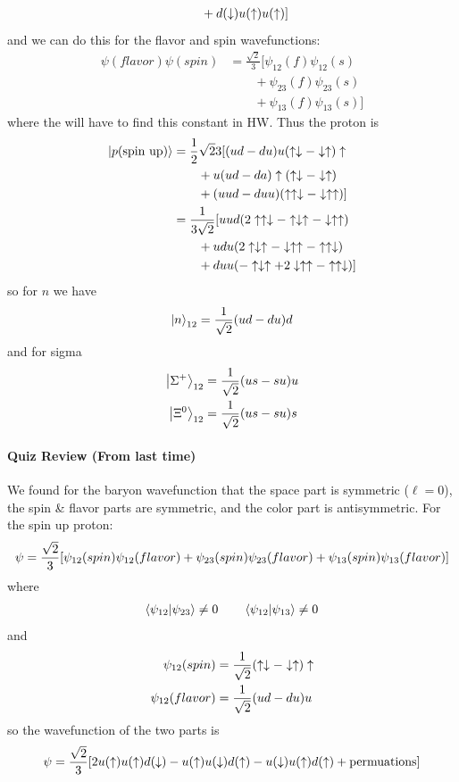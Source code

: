 \documentclass[../main.tex]{subfiles}
\begin{document}
\begin{itemize}
\begin{align*}
        &\qquad + d(\downarrow) u(\uparrow) u(\uparrow)] \\
    \end{align*}
    and we can do this for the flavor and spin wavefunctions:
    \begin{align*}
        \psi(flavor) \psi(spin) &= \frac{\sqrt{2}}{3} [\psi_{12}(f)\psi_{12}(s) \\
        &\qquad + \psi_{23}(f)\psi_{23}(s) \\
        &\qquad + \psi_{13}(f)\psi_{13}(s)]
    \end{align*}
where the will have to find this constant in HW. Thus the proton is
\begin{align*}
    \ket{p(\text{spin up})} &= \frac{1}{2 }\sqrt{2}{3} [(ud -du)u (\uparrow\downarrow - \downarrow\uparrow)\uparrow \\
    &\qquad + u(ud - da) \uparrow(\uparrow\downarrow - \downarrow\uparrow) \\
    &\qquad + (uud - duu) (\uparrow\uparrow\downarrow - \downarrow\uparrow\uparrow)] \\
    &= \frac{1}{3\sqrt{2}} [uud(2\uparrow\uparrow\downarrow - \uparrow\downarrow\uparrow - \downarrow\uparrow\uparrow) \\
    &\qquad + udu(2\uparrow\downarrow\uparrow - \downarrow\uparrow\uparrow - \uparrow\uparrow\downarrow) \\
    &\qquad + duu(-\uparrow\downarrow\uparrow + 2\downarrow\uparrow\uparrow - \uparrow\uparrow\downarrow)]
\end{align*}
so for $n$ we have
\begin{align*}
    \ket{n}_{12} = \frac{1}{\sqrt{2}} (ud -du)d 
\end{align*}
and for sigma
\begin{align*}
    \ket{\Sigma^+}_{12} &= \frac{1}{\sqrt{2}} (us -su)u \\
    \ket{\Xi^0}_{12} &= \frac{1}{\sqrt{2}} (us -su)s
\end{align*}
\end{itemize}

\newpage
{}
\paragraph*{Quiz Review (From last time)}
We found for the baryon wavefunction that the space part is symmetric ($\ell = 0$), the spin \&
flavor parts are symmetric, and the color part is antisymmetric. For the spin up proton:
\begin{align*}
    \psi = \frac{\sqrt 2}{3} \qt[\psi_{12}(spin) \psi_{12}(flavor) + \psi_{23}(spin) \psi_{23}(flavor) + \psi_{13}(spin) \psi_{13}(flavor)]
\end{align*}
where
\begin{align*}
    \braket{\psi_{12}}{\psi_{23}} \neq 0 \qquad \braket{\psi_{12}}{\psi_{13}} \neq 0 
\end{align*}
and
\begin{align*}
    \psi_{12}(spin) &= \frac{1}{\sqrt 2} (\uparrow\downarrow- \downarrow\uparrow)\uparrow \\
    \psi_{12}(flavor) &= \frac{1}{\sqrt 2} (ud - du)u
\end{align*}
so the wavefunction of the two parts is
\begin{align*}
    \psi = \frac{\sqrt 2}{3} \qt[2u(\ua) u(\ua) d(\da) - u(\ua) u(\da) d(\ua) - u(\da) u(\ua) d(\ua) 
    + \text{permuations}]
\end{align*}
\end{document}
